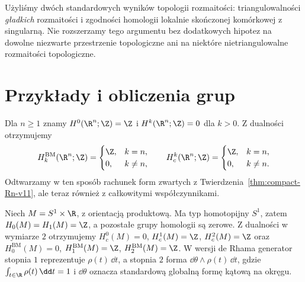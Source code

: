 \begin{uwaga}
Użyliśmy dwóch standardowych wyników topologii
rozmaitości: triangulowalności \emph{gładkich}
rozmaitości i zgodności homologii lokalnie
skończonej komórkowej z singularną. Nie rozszerzamy
tego argumentu bez dodatkowych hipotez na dowolne
niezwarte przestrzenie topologiczne ani na
niektóre nietriangulowalne rozmaitości topologiczne.
\end{uwaga}

\section{Przykłady i obliczenia grup}
\begin{przyklad}
Dla $n\ge1$ znamy $H^0(\R^n;\Z)=\Z$ i
$H^k(\R^n;\Z)=0$ dla $k>0$.
Z dualności otrzymujemy
\[
H_k^{\mathrm{BM}}(\R^n;\Z)=
\begin{cases}\Z,&k=n,\\0,&k\ne n,\end{cases}
\qquad
H_c^k(\R^n;\Z)=
\begin{cases}\Z,&k=n,\\0,&k\ne n.\end{cases}
\]
Odtwarzamy w ten sposób rachunek form zwartych
z Twierdzenia~\ref{thm:compact-Rn-v11},
ale teraz również z całkowitymi współczynnikami.
\end{przyklad}

\begin{przyklad}
Niech $M=S^1\times\R$, z orientacją produktową.
Ma typ homotopijny $S^1$, zatem $H_0(M)=H_1(M)=\Z$,
a pozostałe grupy homologii są zerowe.
Z dualności w wymiarze $2$ otrzymujemy
$H_c^0(M)=0$, $H_c^1(M)=\Z$, $H_c^2(M)=\Z$ oraz
$H_0^{\mathrm{BM}}(M)=0$, $H_1^{\mathrm{BM}}(M)=\Z$,
$H_2^{\mathrm{BM}}(M)=\Z$.
W wersji de Rhama generator stopnia $1$ reprezentuje
$\rho(t)\,\dd t$, a stopnia $2$ forma
$\dd\theta\wedge\rho(t)\,\dd t$, gdzie
$\int_{t\in\R}\rho(t)\,\dd t=1$ i $\dd\theta$ oznacza
standardową globalną formę kątową na okręgu.
\end{przyklad}

